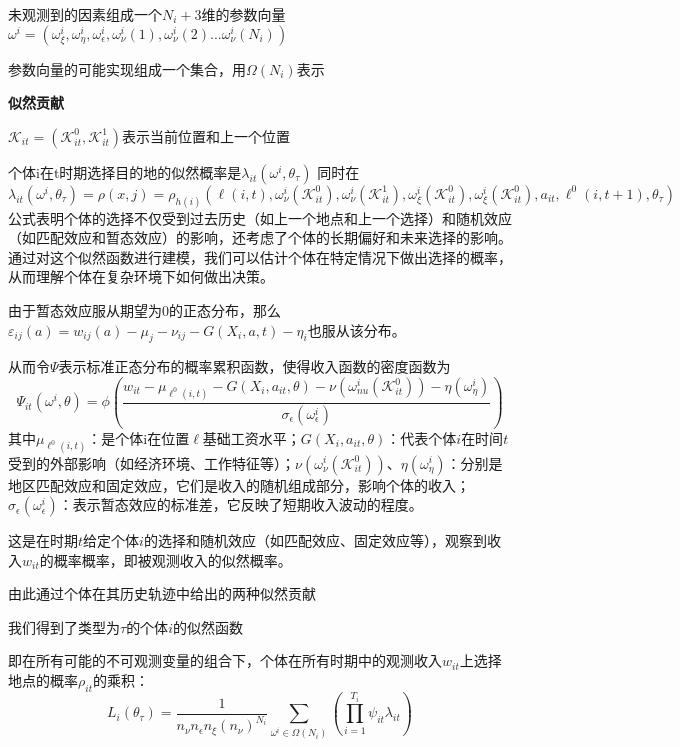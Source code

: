 \documentclass[a4paper,12pt]{article}
\begin{document}
未观测到的因素组成一个$N_{i}+3$维的参数向量$\omega^{i}=(\omega^{i}_{\xi},\omega^{i}_{\eta},\omega^{i}_{\epsilon},\omega^{i}_{\nu}(1),\omega^{i}_{\nu}(2)...\omega^{i}_{\nu}(N_{i}))$

参数向量的可能实现组成一个集合，用$\Omega(N_{i})$表示

\textbf{似然贡献}

$\mathcal{K}_{it}=(\mathcal{K}_{it}^{0},\mathcal{K}_{it}^{1})$表示当前位置和上一个位置

个体i在t时期选择目的地的似然概率是$\lambda_{it}(\omega^{i},\theta_{\tau})$
同时在
\begin{equation}
  \lambda_{it}(\omega^{i},\theta_{\tau})=\rho(x,j)=\rho_{h(i)}(\ell(i,t),\omega_{\nu}^{i}(\mathcal{K}_{it}^{0}),\omega_{\nu}^{i}(\mathcal{K}_{it}^{1}),\omega_{\xi}^{i}(\mathcal{K}_{it}^{0}),\omega_{\xi}^{i}(\mathcal{K}_{it}^{0}),a_{it},\ell^{0}(i,t+1),\theta_{\tau})
\end{equation}
公式表明个体的选择不仅受到过去历史（如上一个地点和上一个选择）和随机效应（如匹配效应和暂态效应）的影响，还考虑了个体的长期偏好和未来选择的影响。
通过对这个似然函数进行建模，我们可以估计个体在特定情况下做出选择的概率，从而理解个体在复杂环境下如何做出决策。


由于暂态效应服从期望为0的正态分布，那么$\varepsilon_{ij}(a)=w_{ij}(a)-\mu_j-\nu_{ij}-G(X_i,a,t)-\eta_i$也服从该分布。

从而令$\Psi$表示标准正态分布的概率累积函数，使得收入函数的密度函数为
\begin{equation}
  \Psi_{it}(\omega^{i},\theta)=\phi(\frac{w_{it} - \mu_{\ell^{0}(i,t)}-G(X_{i},a_{it},\theta)-\nu(\omega_{nu}^{i}(\mathcal{K}_{it}^{0}))-\eta(\omega_{\eta}^{i})  }{\sigma_{\epsilon}(\omega_{\epsilon}^{i})})
\end{equation}
其中$\mu_{\ell^{0}(i,t)}$：是个体i在位置$\ell$基础工资水平；$G(X_i, a_{it}, \theta)$：代表个体$i$在时间$t$受到的外部影响（如经济环境、工作特征等）；$\nu(\omega_{\nu}^i(\mathcal{K}_{it}^0))$、$\eta(\omega_{\eta}^i)$：分别是地区匹配效应和固定效应，它们是收入的随机组成部分，影响个体的收入；$\sigma_{\epsilon}(\omega_{\epsilon}^i)$：表示暂态效应的标准差，它反映了短期收入波动的程度。

这是在时期$t$给定个体$i$的选择和随机效应（如匹配效应、固定效应等），观察到收入$w_{it}$的概率概率，即被观测收入的似然概率。

由此通过个体在其历史轨迹中给出的两种似然贡献

我们得到了类型为$\tau$的个体$i$的似然函数

即在所有可能的不可观测变量的组合下，个体在所有时期中的观测收入$w_{it}$上选择地点的概率$\rho_{it}$的乘积：
\begin{equation}
  L_{i}(\theta_{\tau})=\frac{1}{n_{\nu}n_{\epsilon}n_{\xi}(n_{\nu})^{N_{i}}} \sum\limits_{\omega^{i}\in\Omega(N_{i})}(\prod\limits_{i=1}^{T_{i}} \psi_{it}\lambda_{it})
\end{equation}
\end{document}
